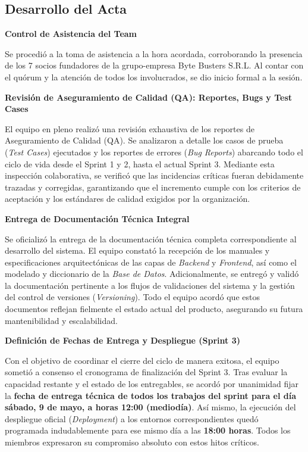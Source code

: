 \newpage
\subsection{Desarrollo del Acta}

\noindent \textbf{Control de Asistencia del Team}\par
Se procedió a la toma de asistencia a la hora acordada, corroborando la presencia de los 7 socios fundadores de la grupo-empresa Byte Busters S.R.L. Al contar con el quórum y la atención de todos los involucrados, se dio inicio formal a la sesión.

\vspace*{0.5cm}
\noindent \textbf{Revisión de Aseguramiento de Calidad (QA): Reportes, Bugs y Test Cases}\par
El equipo en pleno realizó una revisión exhaustiva de los reportes de Aseguramiento de Calidad (QA). Se analizaron a detalle los casos de prueba (\textit{Test Cases}) ejecutados y los reportes de errores (\textit{Bug Reports}) abarcando todo el ciclo de vida desde el Sprint 1 y 2, hasta el actual Sprint 3. Mediante esta inspección colaborativa, se verificó que las incidencias críticas fueran debidamente trazadas y corregidas, garantizando que el incremento cumple con los criterios de aceptación y los estándares de calidad exigidos por la organización.

\vspace*{0.5cm}
\noindent \textbf{Entrega de Documentación Técnica Integral}\par
Se oficializó la entrega de la documentación técnica completa correspondiente al desarrollo del sistema. El equipo constató la recepción de los manuales y especificaciones arquitectónicas de las capas de \textit{Backend} y \textit{Frontend}, así como el modelado y diccionario de la \textit{Base de Datos}. Adicionalmente, se entregó y validó la documentación pertinente a los flujos de validaciones del sistema y la gestión del control de versiones (\textit{Versioning}). Todo el equipo acordó que estos documentos reflejan fielmente el estado actual del producto, asegurando su futura mantenibilidad y escalabilidad.

\vspace*{0.5cm}
\noindent \textbf{Definición de Fechas de Entrega y Despliegue (Sprint 3)}\par
Con el objetivo de coordinar el cierre del ciclo de manera exitosa, el equipo sometió a consenso el cronograma de finalización del Sprint 3. Tras evaluar la capacidad restante y el estado de los entregables, se acordó por unanimidad fijar la \textbf{fecha de entrega técnica de todos los trabajos del sprint para el día sábado, 9 de mayo, a horas 12:00 (mediodía)}. Así mismo, la ejecución del despliegue oficial (\textit{Deployment}) a los entornos correspondientes quedó programada indudablemente para ese mismo día a las \textbf{18:00 horas}. Todos los miembros expresaron su compromiso absoluto con estos hitos críticos.

